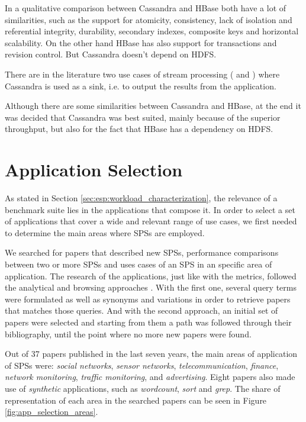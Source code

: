 \documentclass[ppgc,diss,english]{iiufrgs}
\begin{document}
In a qualitative comparison between Cassandra and HBase \cite{moniruzzaman2013nosql} both have a lot of similarities, such as the support for atomicity, consistency, lack of isolation and referential integrity, durability, secondary indexes, composite keys and horizontal scalability. On the other hand HBase has also support for transactions and revision control. But Cassandra doesn't depend on HDFS.

There are in the literature two use cases of stream processing (\cite{wang2013cluster} and \cite{chardonnens2013big}) where Cassandra is used as a sink, i.e. to output the results from the application.

Although there are some similarities between Cassandra and HBase, at the end it was decided that Cassandra was best suited, mainly because of the superior throughput, but also for the fact that HBase has a dependency on HDFS.

\section{Application Selection}
\label{sec:application-selection}

As stated in Section \ref{sec:esp:workload_characterization}, the relevance of a benchmark suite lies in the applications that compose it. In order to select a set of applications that cover a wide and relevant range of use cases, we first needed to determine the main areas where SPSs are employed.

We searched for papers that described new SPSs, performance comparisons between two or more SPSs and uses cases of an SPS in an specific area of application. The research of the applications, just like with the metrics, followed the analytical and browsing approaches \cite{best2014systematically}. With the first one, several query terms were formulated as well as synonyms and variations in order to retrieve papers that matches those queries. And with the second approach, an initial set of papers were selected and starting from them a path was followed through their bibliography, until the point where no more new papers were found.

Out of 37 papers published in the last seven years, the main areas of application of SPSs were: \emph{social networks}, \emph{sensor networks}, \emph{telecommunication}, \emph{finance}, \emph{network monitoring}, \emph{traffic monitoring}, and \emph{advertising}. Eight papers also made use of \emph{synthetic} applications, such as \emph{wordcount}, \emph{sort} and \emph{grep}. The share of representation of each area in the searched papers can be seen in Figure \ref{fig:app_selection_areas}.
\end{document}
